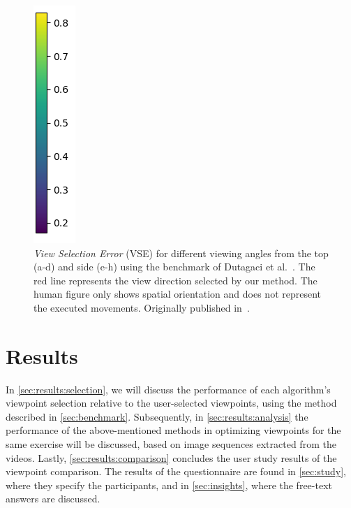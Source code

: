 \begin{figure}[ht]
	    \includegraphics[width=0.041\linewidth]{pictures/scale.png}
	\caption{\emph{View Selection Error} (VSE) for different viewing angles from the top (a-d) and side (e-h) using the benchmark of Dutagaci et al.~\cite{dutagaci2010bbv}. The red line represents the view direction selected by our method. The human figure only shows spatial orientation and does not represent the executed movements. Originally published in~\cite{diller2024automatic}.}
	\label{fig:colorMaps}
\end{figure}

\section{Results\label{results}}
In \autoref{sec:results:selection}, we will discuss the performance of each algorithm's viewpoint selection relative to the user-selected viewpoints, using the method described in \autoref{sec:benchmark}. Subsequently, in \autoref{sec:results:analysis} the performance of the above-mentioned methods in optimizing viewpoints for the same exercise will be discussed, based on image sequences extracted from the videos. Lastly, \autoref{sec:results:comparison} concludes the user study results of the viewpoint comparison. The results of the questionnaire are found in \autoref{sec:study}, where they specify the participants, and in \autoref{sec:insights}, where the free-text answers are discussed.

